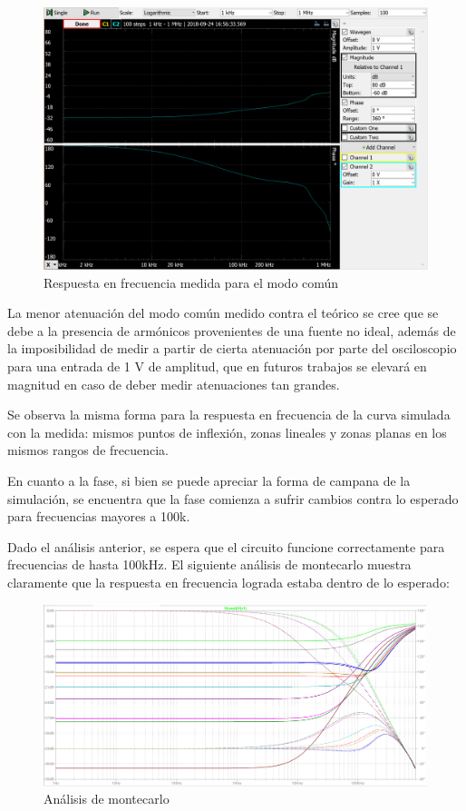 \documentclass[../../tc_tp3_main.tex]{subfiles}
\begin{document}
		\begin{figure}[h!]	
		\centering
		\includegraphics[scale=0.6]{imagenes/bode_comun_medido.png}
		\caption{Respuesta en frecuencia medida para el modo común}
		\label{fig:ej3_bode_comun_medido}
	\end{figure}
	La menor atenuación del modo común medido contra el teórico se cree que se debe a la presencia de armónicos provenientes de una fuente no ideal, además de la imposibilidad de medir a partir de cierta atenuación por parte del osciloscopio para una entrada de 1 V de amplitud, que en futuros trabajos se elevará en magnitud en caso de deber medir atenuaciones tan grandes.\par
	Se observa la misma forma para la respuesta en frecuencia de la curva simulada con la medida: mismos puntos de inflexión, zonas lineales y zonas planas en los mismos rangos de frecuencia.\par
	En cuanto a la fase,  si bien se puede apreciar la forma de campana de la simulación, se encuentra que la fase comienza a sufrir cambios contra lo esperado para frecuencias mayores a 100k. \par
	Dado el análisis anterior, se espera que el circuito funcione correctamente para frecuencias de hasta 100kHz.
	El siguiente análisis de montecarlo muestra claramente que la respuesta en frecuencia lograda estaba dentro de lo esperado:
	
			\begin{figure}[h!]	
		\centering
		\includegraphics[scale=0.6]{imagenes/bode_comun_montecarlo.png}
		\caption{Análisis de montecarlo}
		\label{fig:ej3_bode_comun_medido}
	\end{figure}
	
\end{document}
